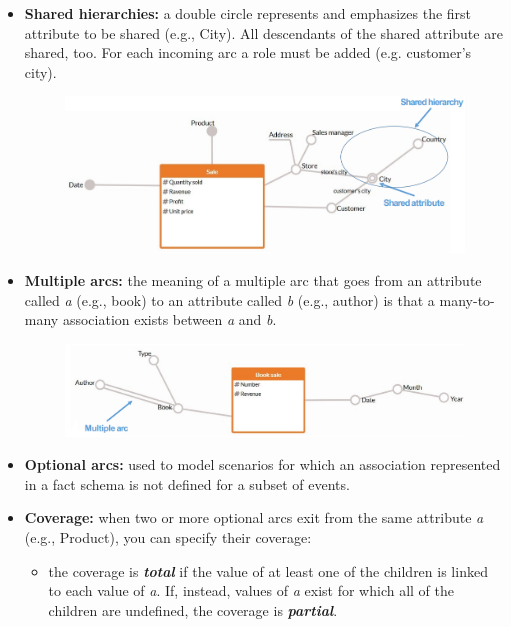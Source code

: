 \begin{itemize}
\begin{figure}[ht!]
    \end{figure}
    \item \textbf{Shared hierarchies:} a double circle represents and emphasizes the first attribute to be shared (e.g., City). All descendants of the shared attribute are shared, too. For each incoming arc a role must be added (e.g. customer's city).
    \begin{figure}[ht!]
        \centering
        \includegraphics[scale=0.7]{images/DFM_shared_hierarchies.png}
    \end{figure}
    \item \textbf{Multiple arcs:} the meaning of a multiple arc that goes from an attribute called \textit{a} (e.g., book) to an attribute called \textit{b} (e.g., author) is that a many-to-many association exists between \textit{a} and \textit{b}.
    \begin{figure}[ht!]
        \centering
        \includegraphics[scale=0.65]{images/DFM_multiple_arcs.png}
    \end{figure}
    \item \textbf{Optional arcs:} used to model scenarios for which an association represented in a fact schema is not defined for a subset of events.
    \item \textbf{Coverage:} when two or more optional arcs exit from the same attribute \textit{a} (e.g., Product), you can specify their coverage:
    \begin{itemize}
        \item the coverage is \textit{\textbf{total}} if the value of at least one of the children is linked to each value of \textit{a}. If, instead, values of \textit{a} exist for which all of the children are undefined, the coverage is \textit{\textbf{partial}}.

\end{itemize}
\end{itemize}
